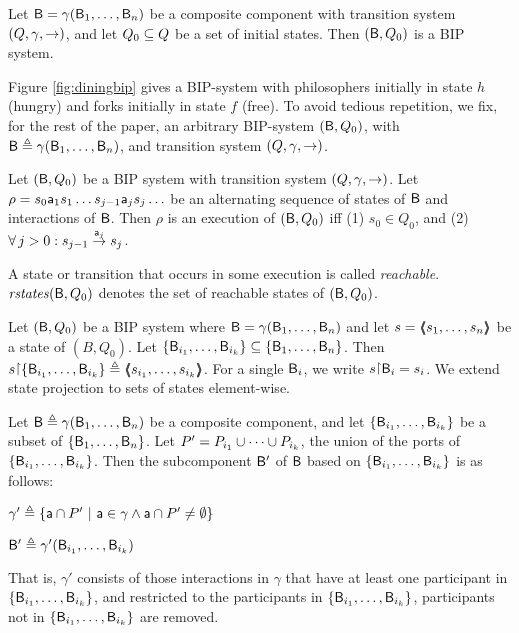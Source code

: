 \begin{definition}\label{def.bip.system} Let $\B = \gamma(\B_1,\dots,\B_n)$ be a composite component with transition system $(Q,\gamma,
\goestog)$, and let $Q_0 \sub Q$ be a set of initial states. Then
$(\B,Q_0)$ is a BIP system.  
\end{definition}

\noindent
Figure \ref{fig:diningbip} gives a BIP-system with philosophers initially in state $h$ (hungry) and forks initially in
state $f$ (free).
%
To avoid tedious repetition, we fix, for the rest of the paper, an arbitrary BIP-system $(\B, Q_0)$, with
$\B \df \gamma(\B_1,\dots,\B_n)$, and transition system $(Q,\gamma, \goestog)$.

\begin{definition}[Execution]\label{def.bip.execution} Let $(\B, Q_0)$ be a BIP system
with transition system $(Q,\gamma, \goestog)$.  Let $\rho = s_0 \act_1 s_1 \ldots s_{j-1} \act_j s_j \ldots$ be an alternating sequence of
states of $\B$ and interactions of $\B$. Then $\rho$ is an execution of
$(\B, Q_0)$ iff (1) $s_0 \in Q_0$, and (2) $\fa j > 0: s_{j-1} \goesto[\act_j] s_j$. 
\end{definition}

\begin{definition}\label{def.bip.reachable}
A state or transition that occurs in some execution is called \emph{reachable}.
$\rstates{\B,Q_0}$ denotes the set of reachable states of $(\B, Q_0)$.
\end{definition}


\begin{definition}\label{def.bip.state.projection} Let $(\B, Q_0)$ be a BIP system where $\B = \gamma(\B_1,\dots,\B_n)$ and let
$s = \tpl{s_1,\dots,s_n}$ be a state of $(B, Q_0)$. Let $\set{\B_{i_1},\dots,\B_{i_k}} \sub \set{\B_1,\dots,\B_n}$. Then
$s \pj \set{\B_{i_1},\dots,\B_{i_k}} \df \tpl{s_{i_1},\dots,s_{i_k}}$. For a single $\B_i$, we write $s \pj \B_i = s_i$.
%
We extend state projection to sets of states element-wise.
\end{definition}

\begin{definition}[Subcomponent]\label{def.bip.subcomponent} Let $\B \df \gamma(\B_1,\dots,\B_n)$ be a composite component, and let $\set{\B_{i_1},\dots,\B_{i_k}}$
be a subset of $\set{\B_{1},\dots,\B_{n}}$.  Let $P' = P_{i_1} \un \cdots \un P_{i_k}$, \ie the union of the ports of $\set{\B_{i_1},\dots,\B_{i_k}}$.
Then the subcomponent $\B'$ of $\B$ based on $\set{\B_{i_1},\dots,\B_{i_k}}$ is as follows:
%
\bn
\item $\gamma' \df \set{ \act \ints P' \st \act \in \gamma \land \act \ints P' \ne \emptyset}$
\item $\B' \df \gamma'(\B_{i_1},\dots,\B_{i_k})$ 
\en
\end{definition}
%
That is, $\gamma'$ consists of those interactions in $\gamma$ that have at least one participant in 
$\set{\B_{i_1},\dots,\B_{i_k}}$, and restricted to the participants in $\set{\B_{i_1},\dots,\B_{i_k}}$,
\ie participants not in $\set{\B_{i_1},\dots,\B_{i_k}}$ are removed.

